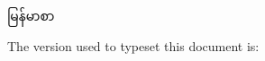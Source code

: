 \documentclass{article}
\begin{document}
မြန်မာစာ

The version used to typeset this document is:
\the\XeTeXversion\XeTeXrevision
\end{document}
